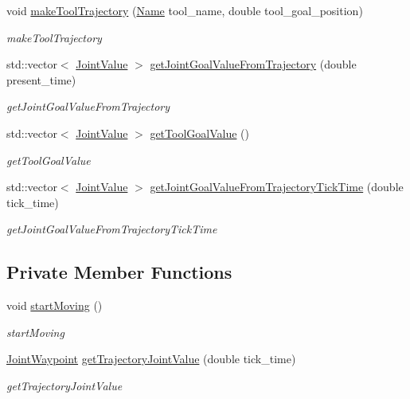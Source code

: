 \begin{DoxyCompactItemize}
void \hyperlink{classrobotis__manipulator_1_1_robotis_manipulator_a198271e58e3f35375b03c17389cadddc}{make\+Tool\+Trajectory} (\hyperlink{namespacerobotis__manipulator_a08c2d25e77a01ad75b9bb740f8ce4765}{Name} tool\+\_\+name, double tool\+\_\+goal\+\_\+position)
\begin{DoxyCompactList}\small\item\em make\+Tool\+Trajectory \end{DoxyCompactList}\item 
std\+::vector$<$ \hyperlink{namespacerobotis__manipulator_aa0556c98c5294ccf3a96c2d0fe315e40}{Joint\+Value} $>$ \hyperlink{classrobotis__manipulator_1_1_robotis_manipulator_a78ce7a7754a99409c082e9124403cb62}{get\+Joint\+Goal\+Value\+From\+Trajectory} (double present\+\_\+time)
\begin{DoxyCompactList}\small\item\em get\+Joint\+Goal\+Value\+From\+Trajectory \end{DoxyCompactList}\item 
std\+::vector$<$ \hyperlink{namespacerobotis__manipulator_aa0556c98c5294ccf3a96c2d0fe315e40}{Joint\+Value} $>$ \hyperlink{classrobotis__manipulator_1_1_robotis_manipulator_ac0816b1c8adeebf66577c88ceea0bf95}{get\+Tool\+Goal\+Value} ()
\begin{DoxyCompactList}\small\item\em get\+Tool\+Goal\+Value \end{DoxyCompactList}\item 
std\+::vector$<$ \hyperlink{namespacerobotis__manipulator_aa0556c98c5294ccf3a96c2d0fe315e40}{Joint\+Value} $>$ \hyperlink{classrobotis__manipulator_1_1_robotis_manipulator_aeabf7d5e0159fa82898e6372313ee44c}{get\+Joint\+Goal\+Value\+From\+Trajectory\+Tick\+Time} (double tick\+\_\+time)
\begin{DoxyCompactList}\small\item\em get\+Joint\+Goal\+Value\+From\+Trajectory\+Tick\+Time \end{DoxyCompactList}\end{DoxyCompactItemize}
\subsection*{Private Member Functions}
\begin{DoxyCompactItemize}
\item 
void \hyperlink{classrobotis__manipulator_1_1_robotis_manipulator_a471cb5d00c34dfe28fd260daaf4fd7a7}{start\+Moving} ()
\begin{DoxyCompactList}\small\item\em start\+Moving \end{DoxyCompactList}\item 
\hyperlink{namespacerobotis__manipulator_a4456fd8b14e1f6b7733a77837dfe9339}{Joint\+Waypoint} \hyperlink{classrobotis__manipulator_1_1_robotis_manipulator_a94f13f3855b973d213a260e097b25fa2}{get\+Trajectory\+Joint\+Value} (double tick\+\_\+time)
\begin{DoxyCompactList}\small\item\em get\+Trajectory\+Joint\+Value \end{DoxyCompactList}\end{DoxyCompactItemize}
